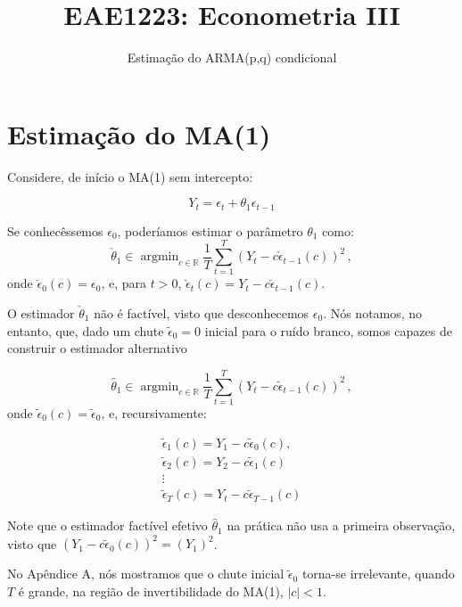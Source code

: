 \documentclass[10pt,a4paper]{article}
\title{\large EAE1223: Econometria III}
\author{\normalsize Estimação do ARMA(p,q) condicional}
\date{}
\begin{document}
\maketitle
\section*{Estimação do MA(1)}

Considere, de início o MA(1) sem intercepto:

$$Y_t = \epsilon_{t} + \theta_1 \epsilon_{t-1}$$

Se conhecêssemos $\epsilon_{0}$, poderíamos estimar o parâmetro $\theta_1$ como:
\begin{equation}
	\check{\theta}_1 \in \operatorname{argmin}_{c \in \mathbb{R}} \frac{1}{T}\sum_{t=1}^T (Y_t - c \check \epsilon_{t-1}(c))^2 \, ,
\end{equation}
onde $\check \epsilon_{0}(c) = \epsilon_{0}$, e, para $t > 0$, $\check \epsilon_{t}(c) = Y_t - c \check \epsilon_{t-1}(c)$.

O estimador $\check{\theta}_1$ não é factível, visto que desconhecemos $\epsilon_{0}$. Nós notamos, no entanto, que, dado um chute $\tilde{\epsilon}_0 = 0$ inicial para o ruído branco, somos capazes de construir o estimador alternativo

\begin{equation}
	\label{eq_feasible}
	\hat{\theta}_1 \in \operatorname{argmin}_{c \in \mathbb{R}} \frac{1}{T}\sum_{t=1}^T (Y_t - c \tilde \epsilon_{t-1}(c))^2 \, ,
\end{equation}
onde $\tilde{\epsilon}_0(c) = \tilde{\epsilon}_0$, e, recursivamente:

\begin{equation*}
	\begin{aligned}
		\tilde{\epsilon}_1(c) = Y_1 - c \tilde{\epsilon}_{0}(c) , \\ 
		\tilde{\epsilon}_2(c)= Y_2 - c\tilde{\epsilon}_{1}(c) \\
		\vdots \\
			\tilde{\epsilon}_T(c)=  Y_t - c\tilde{\epsilon}_{T-1}(c) 
	\end{aligned}
\end{equation*}

Note que o estimador factível efetivo $\hat \theta_1$ na prática não usa a primeira observação, visto que $(Y_1-c \tilde{\epsilon}_0(c))^2 = (Y_1)^2$.

No Apêndice A, nós mostramos que o chute inicial $\tilde{\epsilon}_0$ torna-se irrelevante, quando $T$ é grande, na região de invertibilidade do MA(1), $|c|<1$.
\end{document}
